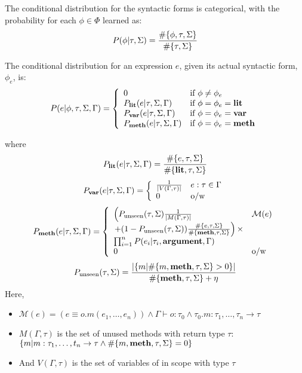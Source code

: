 \documentclass[landscape,final,paperwidth=40in,paperheight=32in,fontscale=0.33]{baposter}
\newcommand{\compresslist}{%
\setlength{\itemsep}{1pt}%
\setlength{\parskip}{0pt}%
\setlength{\parsep}{0pt}%
}
\newcommand{\firstitem}{\item\vskip-5pt}
\begin{document}
\begin{poster}
{  
  The conditional distribution for the syntactic forms is categorical, with the probability for each $\phi \in \Phi$ learned as:
  $$P(\phi | \tau, \Sigma) = \frac{\#\{\phi,\tau, \Sigma\}}{\#\{\tau, \Sigma\}}$$
  
  The conditional distribution for an expression $e$, given its actual syntactic form, $\phi_e$, is:
  \vskip-15pt
$$P(e | \phi, \tau, \Sigma, \Gamma) =
\left\{
	\begin{array}{ll}
		0  & \mbox{if } \phi \neq \phi_e \\
		P_{\textbf{lit}}(e | \tau, \Sigma, \Gamma) & \mbox{if } \phi = \phi_e = \textbf{lit}\\
		P_{\textbf{var}}(e | \tau, \Sigma, \Gamma) & \mbox{if } \phi = \phi_e = \textbf{var}\\
		P_{\textbf{meth}}(e | \tau, \Sigma, \Gamma) & \mbox{if } \phi = \phi_e = \textbf{meth}
	\end{array}
\right.
$$

where
  \vskip-13pt
$$P_{\textbf{lit}}(e | \tau, \Sigma, \Gamma) = \frac{\#\{e, \tau, \Sigma\}}{\#\{\textbf{lit}, \tau, \Sigma\}}$$
$$P_{\textbf{var}}(e | \tau, \Sigma, \Gamma) = 
\left\{
	\begin{array}{ll}
	\frac{1}{|V(\Gamma, \tau)|} & e : \tau \in \Gamma\\
	0 & \mbox{o/w}
	\end{array}
\right.$$
$$P_{\textbf{meth}}(e | \tau, \Sigma, \Gamma) = 
\left\{
	\begin{array}{ll}
          \left(P_{\text{unseen}}(\tau, \Sigma)\frac{1}{|M(\Gamma, \tau)|}\right. & \mathcal{M}(e) \\
	\left. + (1 - P_{\text{unseen}}(\tau, \Sigma))\frac{\#\{e, \tau, \Sigma\}}{\#\{\textbf{meth}, \tau, \Sigma\}} \right) \times & \\
	  \prod_{i=1}^n P(e_i | \tau_i, \textbf{argument}, \Gamma)& \\
	0 & \mbox{o/w}
	\end{array}
\right.$$
  \vskip-8pt
$$P_{\text{unseen}}(\tau, \Sigma) = \frac{ |\{m | \#\{m, \textbf{meth}, \tau, \Sigma\} > 0\}|}{\#\{\textbf{meth}, \tau, \Sigma\} + \eta}$$
Here, 
  \begin{itemize}\compresslist
    \firstitem $\mathcal{M}(e) = (e \equiv o.m(e_1, \ldots, e_n))  \land \Gamma \vdash o : \tau_0 \land \tau_0.m : \tau_1, \ldots, \tau_n \to \tau$
    \item $M(\Gamma, \tau)$ is the set of unused methods with return type $\tau$: \\ $\{m | m : \tau_1, \ldots, t_n \to \tau \land \#\{m, \textbf{meth}, \tau, \Sigma\} = 0\}$
    \item And $V(\Gamma, \tau)$ is the set of variables of  in scope with type $\tau$
  \end{itemize}
    }


\end{poster}
\end{document}
